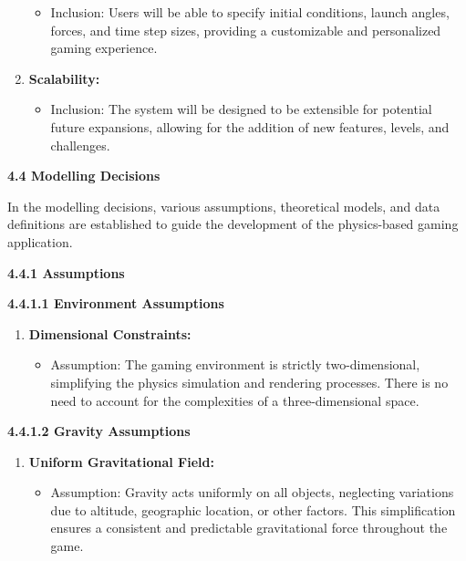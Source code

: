 \documentclass[
]{article}
\begin{document}
\begin{enumerate}
  \begin{itemize}
  \item
    Inclusion: Users will be able to specify initial conditions, launch
    angles, forces, and time step sizes, providing a customizable and
    personalized gaming experience.
  \end{itemize}
\item
  \textbf{Scalability:}

  \begin{itemize}
  \item
    Inclusion: The system will be designed to be extensible for
    potential future expansions, allowing for the addition of new
    features, levels, and challenges.
  \end{itemize}
\end{enumerate}

\protect\hypertarget{qrrrrrrrrrrr}{}{}\textbf{4.4 Modelling Decisions}

In the modelling decisions, various assumptions, theoretical models, and
data definitions are established to guide the development of the
physics-based gaming application.

\protect\hypertarget{qrrrrrrrrrrrr}{}{}\textbf{4.4.1 Assumptions}

\textbf{4.4.1.1 Environment Assumptions}

\begin{enumerate}
\def\labelenumi{\arabic{enumi}.}
\item
  \textbf{Dimensional Constraints:}

  \begin{itemize}
  \item
    Assumption: The gaming environment is strictly two-dimensional,
    simplifying the physics simulation and rendering processes. There is
    no need to account for the complexities of a three-dimensional
    space.
  \end{itemize}
\end{enumerate}

\textbf{4.4.1.2 Gravity Assumptions}

\begin{enumerate}
\def\labelenumi{\arabic{enumi}.}
\setcounter{enumi}{1}
\item
  \textbf{Uniform Gravitational Field:}

  \begin{itemize}
  \item
    Assumption: Gravity acts uniformly on all objects, neglecting
    variations due to altitude, geographic location, or other factors.
    This simplification ensures a consistent and predictable
    gravitational force throughout the game.
  \end{itemize}
\end{enumerate}
\end{document}
